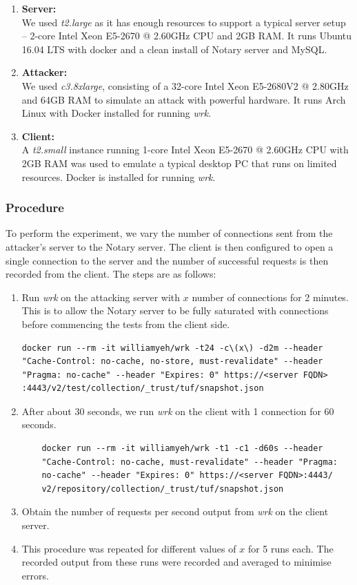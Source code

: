 \documentclass[a4paper,12pt]{article}
\begin{document}
{{	\begin{enumerate}
		\item \textbf{Server:}\\
		We used \textit{t2.large} as it has enough resources to support a typical server setup – 2-core Intel Xeon E5-2670 @ 2.60GHz CPU and 2GB RAM. It runs Ubuntu 16.04 LTS with docker and a clean install of Notary server and MySQL.
		\item \textbf{Attacker:}\\
		We used \textit{c3.8xlarge}, consisting of a 32-core Intel Xeon E5-2680V2 @ 2.80GHz and 64GB RAM to simulate an attack with powerful hardware. It runs Arch Linux with Docker installed for running \textit{wrk}.
		\item \textbf{Client:}\\
		A \textit{t2.small} instance running 1-core Intel Xeon E5-2670 @ 2.60GHz CPU with 2GB RAM was used to emulate a typical desktop PC that runs on limited resources. Docker is installed for running \textit{wrk}.
	\end{enumerate}
}
\subsubsection{Procedure}
To perform the experiment, we vary the number of connections sent from the attacker's server to the Notary server. The client is then configured to open a single connection to the server and the number of successful requests is then recorded from the client. The steps are as follows:
\begin{enumerate}
	\item Run \textit{wrk} on the attacking server with $x$ number of connections for 2 minutes. This is to allow the Notary server to be fully saturated with connections before commencing the tests from the client side.
	\begin{Verbatim}[commandchars=\\\{\}]
docker run --rm -it williamyeh/wrk -t24 -c\(x\) -d2m --header
"Cache-Control: no-cache, no-store, must-revalidate" --header 
"Pragma: no-cache" --header "Expires: 0" https://<server FQDN>
:4443/v2/test/collection/_trust/tuf/snapshot.json
	\end{Verbatim}
	\item After about 30 seconds, we run \textit{wrk} on the client with 1 connection for 60 seconds.
	\begin{verbatim}
	docker run --rm -it williamyeh/wrk -t1 -c1 -d60s --header 
	"Cache-Control: no-cache, must-revalidate" --header "Pragma: 
	no-cache" --header "Expires: 0" https://<server FQDN>:4443/
	v2/repository/collection/_trust/tuf/snapshot.json
	\end{verbatim}
	\item Obtain the number of requests per second output from \textit{wrk} on the client server.
	\item This procedure was repeated for different values of $x$ for 5 runs each. The recorded output from these runs were recorded and averaged to minimise errors.
\end{enumerate}
}
\end{document}
